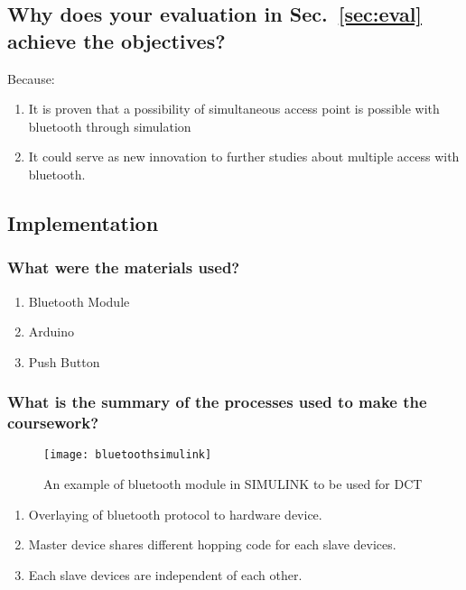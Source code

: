 \subsection{Why does your evaluation in Sec.~\ref{sec:eval}  achieve the objectives?}
Because:
\begin{enumerate}
	\item 
	It is proven that a possibility of simultaneous access point is possible with bluetooth through simulation
	
	\item It could serve as new innovation to further studies about multiple access with bluetooth.
\end{enumerate}



\subsection{Implementation}
\label{sec:implem}

\subsubsection{What were the materials used?}
\begin{enumerate}
	\item Bluetooth Module
	\item Arduino
	\item Push Button
\end{enumerate}


\subsubsection{What is the summary of the processes used to make the coursework?}

\begin{figure}[hp]
	\centering
	\captionsetup{justification=centering,margin=2cm}
	\texttt{[image: bluetoothsimulink]}
	\caption{An example of bluetooth module in SIMULINK to be used for DCT}
\end{figure}

\begin{enumerate}
	\item Overlaying of bluetooth protocol to hardware device.
	\item Master device shares different hopping code for each slave devices.
	\item Each slave devices are independent of each other.
\end{enumerate}

